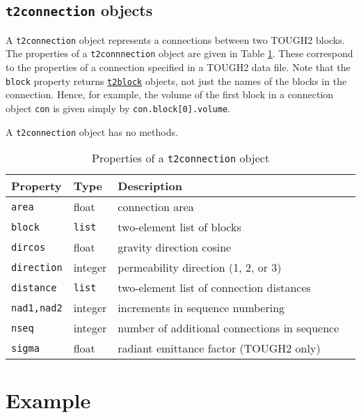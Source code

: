 \subsection{\texttt{t2connection} objects}
\label{t2connectionobjects}

A \texttt{t2connection} object represents a connections between two TOUGH2 blocks.  The properties of a \texttt{t2connnection} object are given in Table \ref{tb:t2connection_properties}.  These correspond to the properties of a connection specified in a TOUGH2 data file.  Note that the \texttt{block} property returns \hyperref[t2blockobjects]{\texttt{t2block}} objects, not just the names of the blocks in the connection.  Hence, for example, the volume of the first block in a connection object \texttt{con} is given simply by \texttt{con.block[0].volume}.

A \texttt{t2connection} object has no methods.

\begin{table}
  \begin{center}
    \begin{tabular}{|l|l|l|l|}
      \hline
      \textbf{Property} & \textbf{Type} & \textbf{Description}\\
      \hline
      \texttt{area} & float & connection area\\
      \texttt{block} & \texttt{list} & two-element list of blocks\\
      \texttt{dircos} & float & gravity direction cosine\\
      \texttt{direction} & integer & permeability direction (1, 2, or 3)\\
      \texttt{distance} & \texttt{list} & two-element list of connection distances\\
      \texttt{nad1,nad2} & integer & increments in sequence numbering\\
      \texttt{nseq} & integer & number of additional connections in sequence\\
      \texttt{sigma} & float & radiant emittance factor (TOUGH2 only)\\
      \hline
    \end{tabular}
    \caption{Properties of a \texttt{t2connection} object}
    \label{tb:t2connection_properties}
  \end{center}
\end{table}

\section{Example}

